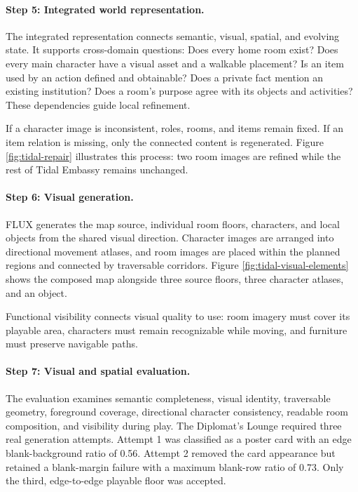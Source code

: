 \paragraph{Step 5: Integrated world representation.}
The integrated representation connects semantic, visual, spatial, and evolving
state. It supports cross-domain questions:
Does every home room exist? Does every main character have a visual asset and a
walkable placement? Is an item used by an action defined and obtainable? Does a
private fact mention an existing institution? Does a room's purpose agree with
its objects and activities? These dependencies guide local refinement.

If a character image is inconsistent, roles, rooms, and items remain fixed. If
an item relation is missing, only the connected content is regenerated. Figure
\ref{fig:tidal-repair} illustrates this process: two room images are refined
while the rest of Tidal Embassy remains unchanged.

\paragraph{Step 6: Visual generation.}
FLUX generates the map source, individual room floors, characters, and local
objects from the shared visual direction. Character images are arranged into
directional movement atlases, and room images are placed within the planned
regions and connected by traversable corridors. Figure
\ref{fig:tidal-visual-elements} shows the composed map alongside three source floors,
three character atlases, and an object.

Functional visibility connects visual quality to use: room imagery must cover
its playable area, characters must remain recognizable while moving, and
furniture must preserve navigable paths.

\paragraph{Step 7: Visual and spatial evaluation.}
The evaluation examines semantic completeness, visual identity, traversable
geometry, foreground coverage, directional character consistency, readable
room composition, and visibility during play. The Diplomat's Lounge required
three real generation attempts. Attempt 1 was classified as a poster card with
an edge blank-background ratio of 0.56. Attempt 2 removed the card appearance
but retained a blank-margin failure with a maximum blank-row ratio of 0.73.
Only the third, edge-to-edge playable floor was accepted.

